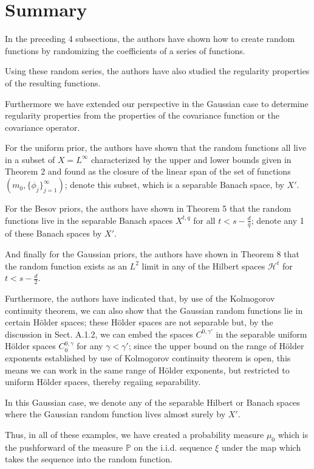 \documentclass[oneside,11pt]{book}
\numberwithin{equation}{section}
\begin{document}
\section{Summary}
In the preceding 4 subsections, the authors have shown how to create random functions by randomizing the coefficients of a series of functions.

Using these random series, the authors have also studied the regularity properties of the resulting functions.

Furthermore we have extended our perspective in the Gaussian case to determine regularity properties from the properties of the covariance function or the covariance operator.

%
For the uniform prior, the authors have shown that the random functions all live in a subset of $X = L^\infty$ characterized by the upper and lower bounds given in Theorem 2 and found as the closure of the linear span of the set of functions $(m_0,\{\phi_j\}_{j=1}^\infty)$; denote this subset, which is a separable Banach space, by $X'$.

For the Besov priors, the authors have shown in Theorem 5 that the random functions live in the separable Banach spaces $X^{t,q}$ for all $t < s - \frac{d}{q}$; denote any 1 of these Banach spaces by $X'$.

And finally for the Gaussian priors, the authors have shown in Theorem 8 that the random function exists as an $L^2$ limit in any of the Hilbert spaces $\mathcal{H}^t$ for $t < s - \frac{d}{2}$.

Furthermore, the authors have indicated that, by use of the Kolmogorov continuity theorem, we can also show that the Gaussian random functions lie in certain H\"older spaces; these H\"older spaces are not separable but, by the discussion in Sect. A.1.2, we can embed the spaces $C^{0,\gamma'}$ in the separable uniform H\"older spaces $C_0^{0,\gamma}$ for any $\gamma < \gamma'$; since the upper bound on the range of H\"older exponents established by use of Kolmogorov continuity theorem is open, this means we can work in the same range of H\"older exponents, but restricted to uniform H\"older spaces, thereby regaiing separability.

In this Gaussian case, we denote any of the separable Hilbert or Banach spaces where the Gaussian random function lives almost surely by $X'$.

%
Thus, in all of these examples, we have created a probability measure $\mu_0$ which is the pushforward of the measure $\mathbb{P}$ on the i.i.d. sequence $\xi$ under the map which takes the sequence into the random function.
\end{document}

